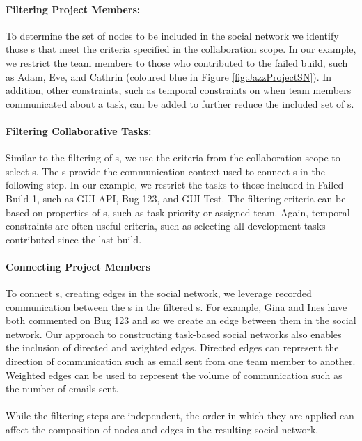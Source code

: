 \paragraph{Filtering Project Members:}
To determine the set of nodes to be included in the social network we identify
those \people s that meet the criteria specified in the collaboration scope. In
our example, we restrict the team members to those who contributed to the failed
build, such as Adam, Eve, and Cathrin (coloured blue in Figure
\ref{fig:JazzProjectSN}). In addition, other constraints, such as temporal
constraints on when team members communicated about a task, can be added to
further reduce the included set of \people s.

\paragraph{Filtering Collaborative Tasks:}
Similar to the filtering of \people s, we use the criteria from the collaboration
scope to select \cu s. The \cu s provide the communication context used to
connect \people s in the following step. In our example, we restrict the tasks to
those included in Failed Build 1, such as GUI API, Bug 123, and GUI Test. The
filtering criteria can be based on properties of \cu s, such as task priority or
assigned team. Again, temporal constraints are often useful criteria, such as
selecting all development tasks contributed since the last build.

\paragraph{Connecting Project Members}
To connect \people s, creating edges in the social network, we leverage recorded
communication between the \people s in the filtered \cu s. For example, Gina and
Ines have both commented on Bug 123 and so we create an edge between them in the
social network. Our approach to constructing task-based social networks also
enables the inclusion of directed and weighted edges. Directed edges can
represent the direction of communication such as email sent from one team member
to another. Weighted edges can be used to represent the volume of communication
such as the number of emails sent.

\paragraph{}
While the filtering steps are independent, the order in which they are applied
can affect the composition of nodes and edges in the resulting social network.

